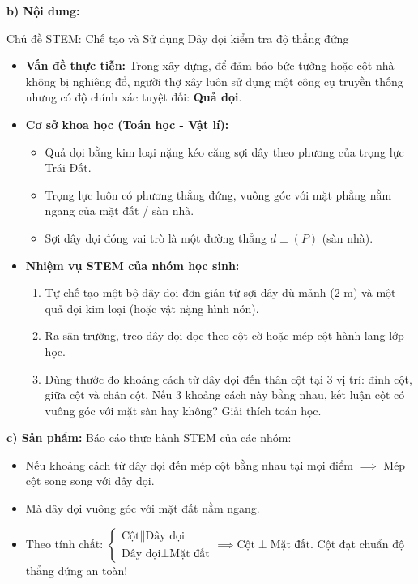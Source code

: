 \documentclass[12pt, a4paper]{article}
\begin{document}
\noindent \textbf{b) Nội dung:}
\begin{stembox}{Chủ đề STEM: Chế tạo và Sử dụng Dây dọi kiểm tra độ thẳng đứng}
\begin{itemize}[leftmargin=0.6cm]
    \item \textbf{Vấn đề thực tiễn:} Trong xây dựng, để đảm bảo bức tường hoặc cột nhà không bị nghiêng đổ, người thợ xây luôn sử dụng một công cụ truyền thống nhưng có độ chính xác tuyệt đối: \textbf{Quả dọi}.
    \item \textbf{Cơ sở khoa học (Toán học - Vật lí):}
    \begin{itemize}
        \item Quả dọi bằng kim loại nặng kéo căng sợi dây theo phương của trọng lực Trái Đất.
        \item Trọng lực luôn có phương thẳng đứng, vuông góc với mặt phẳng nằm ngang của mặt đất / sàn nhà.
        \item Sợi dây dọi đóng vai trò là một đường thẳng $d \perp (P)$ (sàn nhà).
    \end{itemize}
    \item \textbf{Nhiệm vụ STEM của nhóm học sinh:}
    \begin{enumerate}
        \item Tự chế tạo một bộ dây dọi đơn giản từ sợi dây dù mảnh ($2\text{ m}$) và một quả dọi kim loại (hoặc vật nặng hình nón).
        \item Ra sân trường, treo dây dọi dọc theo cột cờ hoặc mép cột hành lang lớp học.
        \item Dùng thước đo khoảng cách từ dây dọi đến thân cột tại 3 vị trí: đỉnh cột, giữa cột và chân cột. Nếu 3 khoảng cách này bằng nhau, kết luận cột có vuông góc với mặt sàn hay không? Giải thích toán học.
    \end{enumerate}
\end{itemize}
\end{stembox}

\noindent \textbf{c) Sản phẩm:}
Báo cáo thực hành STEM của các nhóm:
\begin{itemize}
    \item Nếu khoảng cách từ dây dọi đến mép cột bằng nhau tại mọi điểm $\implies$ Mép cột song song với dây dọi.
    \item Mà dây dọi vuông góc với mặt đất nằm ngang.
    \item Theo tính chất: $\begin{cases} \text{Cột} \parallel \text{Dây dọi} \\ \text{Dây dọi} \perp \text{Mặt đất} \end{cases} \implies \text{Cột} \perp \text{Mặt đất}$. Cột đạt chuẩn độ thẳng đứng an toàn!
\end{itemize}
\end{document}
